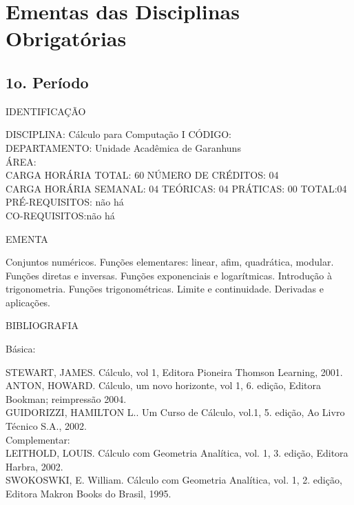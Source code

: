 \documentclass[
	12pt,				%
	openright,			%
  oneside,     %
	a4paper,			%
	chapter=TITLE,		%
	english,			%
	french,				%
	spanish,			%
	brazil				%
	]{abntex2}
\begin{document}
\begin{apendicesenv}
\begin{landscape}
\begin{longtable}{r|r|l|l|l}
    \end{longtable}%
\end{landscape}




\setlength{\parindent}{0in}
\chapter{Ementas das Disciplinas Obrigatórias}
\section*{1o. Período}

IDENTIFICAÇÃO

DISCIPLINA: Cálculo para Computação I CÓDIGO:\\
DEPARTAMENTO: Unidade Acadêmica de Garanhuns\\
ÁREA:\\
CARGA HORÁRIA TOTAL: 60 NÚMERO DE CRÉDITOS: 04\\
CARGA HORÁRIA SEMANAL: 04 TEÓRICAS: 04 PRÁTICAS: 00 TOTAL:04\\
PRÉ-REQUISITOS: não há\\
CO-REQUISITOS:não há

EMENTA

Conjuntos numéricos. Funções elementares: linear, afim, quadrática,
modular. Funções diretas e inversas. Funções exponenciais e
logarítmicas. Introdução à trigonometria. Funções trigonométricas.
Limite e continuidade. Derivadas e aplicações.

BIBLIOGRAFIA

Básica:

STEWART, JAMES. Cálculo, vol 1, Editora Pioneira Thomson Learning,
2001.\\
ANTON, HOWARD. Cálculo, um novo horizonte, vol 1, 6. edição, Editora
Bookman; reimpressão 2004.\\
GUIDORIZZI, HAMILTON L.. Um Curso de Cálculo, vol.1, 5. edição, Ao Livro
Técnico S.A., 2002.\\
Complementar:\\
LEITHOLD, LOUIS. Cálculo com Geometria Analítica, vol. 1, 3. edição,
Editora Harbra, 2002.\\
SWOKOSWKI, E. William. Cálculo com Geometria Analítica, vol. 1, 2.
edição, Editora Makron Books do Brasil, 1995.\\


\end{apendicesenv}
\end{document}
